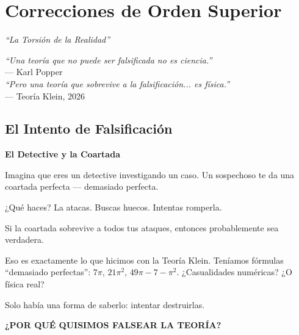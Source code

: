 \chapter{Correcciones de Orden Superior}
\label{cap:correcciones}

\begin{center}
\textit{``La Torsión de la Realidad''}
\end{center}

\vspace{0.5cm}

\begin{tcolorbox}[colback=white, colframe=kleinblue, boxrule=2pt]
\centering
\textit{``Una teoría que no puede ser falsificada no es ciencia.''}\\
--- Karl Popper\\[0.3cm]
\textit{``Pero una teoría que sobrevive a la falsificación... es física.''}\\
--- Teoría Klein, 2026
\end{tcolorbox}


\section{El Intento de Falsificación}

\begin{analogiabox}
\textbf{El Detective y la Coartada}

Imagina que eres un detective investigando un caso.
Un sospechoso te da una coartada perfecta --- demasiado perfecta.

¿Qué haces? La atacas. Buscas huecos. Intentas romperla.

Si la coartada sobrevive a todos tus ataques, entonces probablemente sea verdadera.

Eso es exactamente lo que hicimos con la Teoría Klein.
Teníamos fórmulas ``demasiado perfectas'': $7\pi$, $21\pi^2$, $49\pi - 7 - \pi^2$.
¿Casualidades numéricas? ¿O física real?

Solo había una forma de saberlo: intentar destruirlas.
\end{analogiabox}

\textbf{¿POR QUÉ QUISIMOS FALSEAR LA TEORÍA?}

